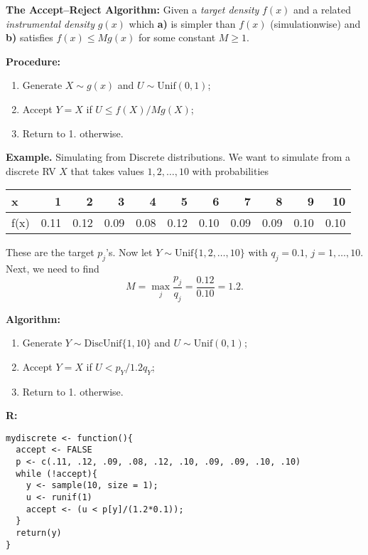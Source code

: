 \documentclass[captions=tableheading]{scrbook}
\begin{document}
\textbf{The Accept--Reject Algorithm:} Given a \emph{target density} $f(x)$ and a related \emph{instrumental density} $g(x)$ which \textbf{a)} is simpler than $f(x)$ (simulationwise) and \textbf{b)} satisfies $f(x)\leq M g(x)$ for some constant $M \geq 1$.

\textbf{Procedure:}

\begin{enumerate}
\item Generate $X\sim g(x)$ and $U \sim \mathrm{Unif}(0,1)$;
\item Accept $Y=X$ if $U\leq f(X)/M g(X)$;
\item Return to 1. otherwise.
\end{enumerate}

\textbf{Example.} Simulating from Discrete distributions. We want to simulate from a discrete RV $X$ that takes values $1,2,\ldots,10$ with probabilities


\begin{center}
\begin{tabular}{lrrrrrrrrrr}
 x     &     1  &     2  &     3  &     4  &     5  &     6  &     7  &     8  &     9  &    10  \\
\hline
 f(x)  &  0.11  &  0.12  &  0.09  &  0.08  &  0.12  &  0.10  &  0.09  &  0.09  &  0.10  &  0.10  \\
\end{tabular}
\end{center}



These are the target $p_{j}$'s. Now let $Y\sim\mathrm{Unif}\{1,2,\ldots,10\}$ with $q_{j}=0.1$, $j=1,\ldots,10$. Next, we need to find 
\[ 
M=\max_{j}\frac{p_{j}}{q_{j}}=\frac{0.12}{0.10}=1.2.
\]

\textbf{Algorithm:}

\begin{enumerate}
\item Generate $Y \sim \mathrm{DiscUnif}\{1,10\}$ and $U\sim\mathrm{Unif}(0,1)$;
\item Accept $Y = X$ if $U < p_{Y}/1.2 q_{Y}$;
\item Return to 1. otherwise.
\end{enumerate}
 
\textbf{R:}
\begin{verbatim}
mydiscrete <- function(){
  accept <- FALSE
  p <- c(.11, .12, .09, .08, .12, .10, .09, .09, .10, .10)
  while (!accept){
    y <- sample(10, size = 1);
    u <- runif(1)
    accept <- (u < p[y]/(1.2*0.1));
  }
  return(y)
}
\end{verbatim}
\end{document}
